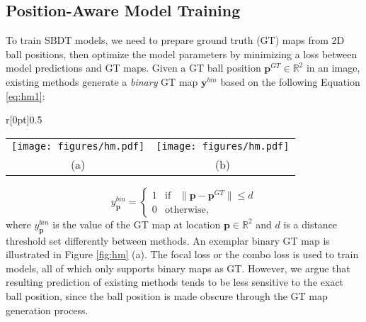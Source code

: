 \documentclass{bmvc2k}
\begin{document}
\subsection{Position-Aware Model Training}
\label{sec:method:train}
To train SBDT models, we need to prepare ground truth (GT) maps from 2D ball positions, then optimize the model parameters by minimizing a loss between model predictions and GT maps.
Given a GT ball position
$\mathbf{p}^{GT} \in \mathbb{R}^{2}$
in an image, existing methods \cite{komorowski+2019mva,komorowski+2019visapp,zandycke+2019mmsports,sun+2020icpai,huang+2019avss,liu+2022cvprw} generate a {\it binary} GT map $\mathbf{y}^{bin}$ based on the following Equation \ref{eq:hm1}:
\begin{wrapfigure}{r}[0pt]{0.5\textwidth}
\vspace*{-2mm}
\centering
\begin{tabular}{cc}
\begin{minipage}[t]{0.2\textwidth}
\centering
\texttt{[image: figures/hm.pdf]}
\end{minipage} &
\begin{minipage}[t]{0.2\textwidth}
\centering
\texttt{[image: figures/hm.pdf]}
\end{minipage}  \\
(a) & (b)
\end{tabular}
\caption{An exemplar (a) binary ground-truth (GT) map and (b) real-valued GT map.}
\label{fig:hm}
\vspace*{-3mm}
\end{wrapfigure}
\begin{equation}
y_{\mathbf{p}}^{bin} =
\begin{cases}
1 & \text{if} \;\;\; \| \mathbf{p} - \mathbf{p}^{GT} \| \leq d \\
0 & \text{otherwise},
\end{cases}
\label{eq:hm1}
\end{equation}
where $y_{\mathbf{p}}^{bin}$ is the value of the GT map at location $\mathbf{p} \in \mathbb{R}^{2}$ and $d$ is a distance threshold set differently between methods.
An exemplar binary GT map is illustrated in Figure \ref{fig:hm} (a).
The focal loss \cite{lin+2017iccv} or the combo loss \cite{taghanaki+cmig} is used to train models, all of which only supports binary maps as GT.
However, we argue that resulting prediction of existing methods tends to be less sensitive to the exact ball position, since the ball position is made obscure through the GT map generation process.
\end{document}
